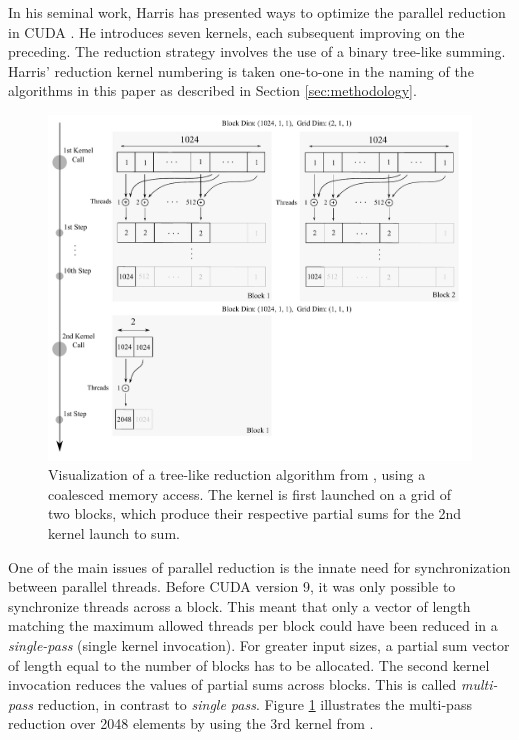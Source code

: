 \documentclass{juliacon}
\begin{document}
In his seminal work, Harris has presented ways to optimize the parallel reduction in CUDA \cite{Harris2007}. He introduces seven kernels, each subsequent improving on the preceding. The reduction strategy involves the use of a binary tree-like summing. Harris' reduction kernel numbering is taken one-to-one in the naming of the algorithms in this paper as described in Section \ref{sec:methodology}.
\begin{figure}[h]
    \centering
    \includegraphics[scale = 0.7]{reduction-tree.pdf}
    
    \caption{\label{fig:reduction} Visualization of a tree-like reduction algorithm from \cite{Harris2007}, using a coalesced memory access. The kernel is first launched on a grid of two blocks, which produce their respective partial sums for the 2nd kernel launch to sum.}
\end{figure}

One of the main issues of parallel reduction is the innate need for synchronization between parallel threads. Before CUDA version 9, it was only possible to synchronize threads across a block. This meant that only a vector of length matching the maximum allowed threads per block could have been reduced in a \emph{single-pass} (single kernel invocation). For greater input sizes, a partial sum vector of length equal to the number of blocks has to be allocated. The second kernel invocation reduces the values of partial sums across blocks. This is called \emph{multi-pass} reduction, in contrast to \emph{single pass}. Figure \ref{fig:reduction} illustrates the multi-pass reduction over 2048 elements by using the 3rd kernel from \cite{Harris2007}.
\end{document}
